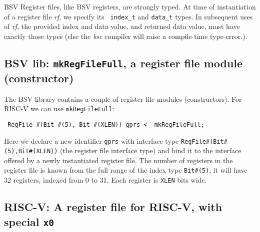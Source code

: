 \vspace{2ex}

BSV Register files, like BSV registers, are strongly typed.  At time
of instantiation of a register file \emph{rf}, we specify its {\tt
index\_t} and {\tt data\_t} types.  In subsequent uses of \emph{rf},
the provided index and data value, and returned data value, must have
exactly those types (else the \emph{bsc} compiler will raise a
compile-time type-error.).


\subsection{BSV lib: {\tt mkRegFileFull}, a register file module (constructor)}

\label{Sec_RegFile_module}


The BSV library contains a couple of register file modules
(constructors). For RISC-V we can use {\tt mkRegFileFull}:


\begin{tabbing}\small\tt
\hmm RegFile \#(Bit \#(5), Bit \#(XLEN)) gprs <- mkRegFileFull;
\end{tabbing}

Here we declare a new identifier \verb|gprs| with interface type
\verb|RegFile#(Bit#(5),Bit#(XLEN))| (the register file interface type)
and bind it to the interface offered by a newly instantiated register
file.  The number of registers in the register file is known from the
full range of the index type \verb|Bit#(5)|, {\ie} it will have 32
registers, indexed from 0 to 31.  Each register is \verb|XLEN| bits
wide.


\subsection{RISC-V: A register file for RISC-V, with special {\tt x0}}

\label{Sec_RISCV_regfile}

